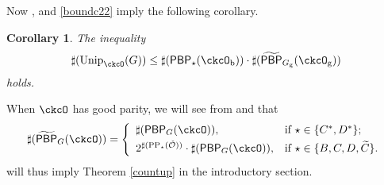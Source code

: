 \documentclass[12pt,a4paper]{amsart}
\newcommand{\CK}{{\mathcal {K}}}
\newcommand{\CO}{{\mathcal {O}}}
\newcommand{\sgn}{\operatorname{sgn}}
\newcommand{\oO}{\operatorname{O}}
\numberwithin{equation}{section}
\newtheorem{prop}[thm]{Proposition}
\newtheorem{cor}[thm]{Corollary}
\theoremstyle{remark}
\def\Unip{\mathrm{Unip}}
\def\LC{{}^{\scriptscriptstyle L}\sC}
\def\Coh{\mathrm{Coh}}
\def\CPPs{\mathrm{PP}_{\star}}
\def\tPBP{\widetilde{\mathsf{PBP}}}
\def\PBP{\mathsf{PBP}}
\def\tPBP{\widetilde{\mathsf{PBP}}}
\begin{document}
Now ,  and \eqref{boundc22} imply the following corollary. 
\begin{cor}\label{prop:countBCD22}
 The inequality
  \[
  \sharp(\Unip_{\ckcO}(G))
      \leq \sharp (\PBP_{\star}(\ckcO_{\mathrm b}))\cdot \sharp(\tPBP_{G_{\mathrm g}}(\ckcO_{\mathrm g}))
  \]
  holds. 
 \end{cor}



When $\ckcO $ has good parity, we will see from  and  that
  \[
    \sharp(\tPBP_{G}(\ckcO)) =
    \left\{
    \begin{array}{ll}
       \sharp (\PBP_{G}(\ckcO)),  & \hbox{if $\star\in \{C^*,D^*\}$}; \smallskip\\
       2^{\sharp(\CPPs(\check \CO))} \cdot \sharp (\PBP_{G}(\ckcO)),  &\hbox{if $\star\in \{B, C,D,\widetilde {C}\}$}.
    \end{array}
  \right.
  \]
  will thus imply Theorem \ref{countup} in the introductory section.




\end{document}
